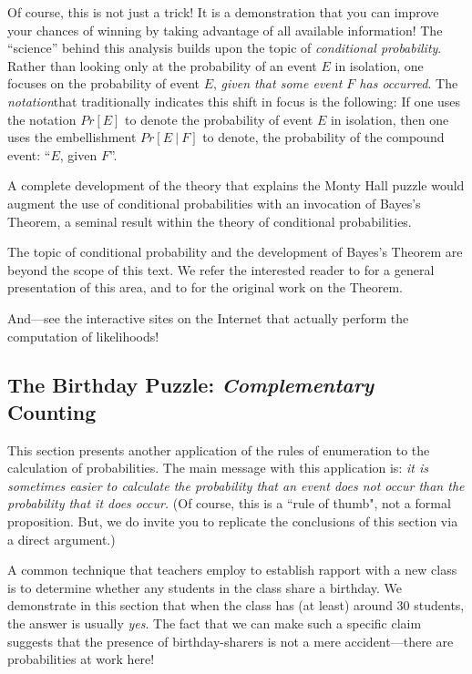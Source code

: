  

Of course, this is not just a trick!  It is a demonstration that you can improve your chances of winning by taking advantage of all available information!  The ``science'' behind this analysis builds upon the topic of {\em conditional probability}.  Rather than looking only at the probability of an event $E$ in isolation, one focuses on the probability of event $E$, {\em given that some event $F$ has occurred}.  The {\em notation}that traditionally indicates this shift in focus is the following: If one uses the notation $Pr[E]$ to denote the probability of event $E$ in isolation, then one uses the embellishment $Pr[E \ | \ F]$ to denote, the probability of the compound event: ``$E$, given $F$''.

A complete development of the theory that explains the Monty Hall puzzle would augment the use of conditional probabilities with an invocation of Bayes's Theorem, a seminal result within the theory of
conditional probabilities.

The topic of conditional probability and the development of Bayes's Theorem are beyond the scope of this text.  We refer the interested reader to \cite{Lee12} for a general presentation of this area, and to
\cite{Bayes} for the original work on the Theorem.

And---see the interactive sites on the Internet that actually perform the computation of likelihoods!


\subsection{The Birthday Puzzle: {\em Complementary} Counting}
\label{sec:birthday-puzzle}

This section presents another application of the rules of enumeration
to the calculation of probabilities.%
The main message with this application is:
{\em it is sometimes easier to calculate the probability that an event {\em does not} occur than
the probability that it {\em does} occur.}  (Of course, this is a ``rule of thumb", not a formal 
proposition. But, we do invite you to replicate the conclusions of this section via a direct argument.)

\medskip

A common technique that teachers employ to establish rapport with a new class is to determine whether any students in the class share a birthday.  We demonstrate in this section that when the class has (at least) around 30 students, the answer is usually \textit{yes}.  The fact that we can make such a specific claim  suggests that the presence of birthday-sharers is not a mere accident---there are probabilities at work here!

